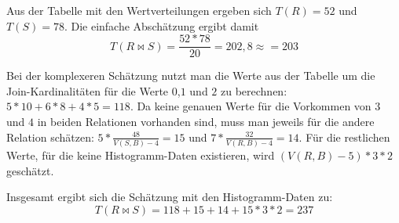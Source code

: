 \documentclass[12pt]{article}
\begin{document}
Aus der Tabelle mit den Wertverteilungen ergeben sich $T(R)=52$ und $T(S)=78$.
Die einfache Abschätzung ergibt damit
$$T (R \bowtie S) = \frac{52*78}{20} = 202,8 \approx = 203$$

Bei der komplexeren Schätzung nutzt man die Werte aus der Tabelle um die
Join-Kardinalitäten für die Werte $0$,$1$ und $2$ zu berechnen:
$5*10+6*8+4*5 = 118$. Da keine genauen Werte für die Vorkommen von $3$ und $4$ in
beiden Relationen vorhanden sind, muss man jeweils für die andere Relation
schätzen: $5*\frac{48}{V(S,B)-4} = 15$ und $7*\frac{32}{V(R,B)-4} = 14$. Für die
restlichen Werte, für die keine Histogramm-Daten existieren, wird $(V(R,B)-5) *
3 * 2$ geschätzt.

Insgesamt ergibt sich die Schätzung mit den Histogramm-Daten zu:
$$T(R \bowtie S) = 118 + 15 + 14 + 15*3*2 = 237$$
\end{document}
